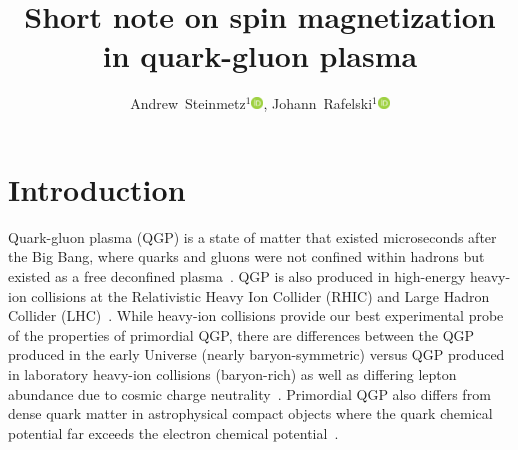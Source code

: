 \documentclass[epjST]{svjour}
\newcommand{\orcidicon}{\includegraphics[width=0.32cm]{orcid.pdf}}
\newcommand{\orc}[1]{\href{https://orcid.org/#1}{\orcidicon}}
\newcommand{\orcJR}{0000-0001-8217-1484}
\newcommand{\orcAJS}{0000-0001-5474-2649}
\begin{document}
\title{Short note on spin magnetization in quark-gluon plasma
    }

\author{
    Andrew~Steinmetz${}^1$\orc{\orcAJS},
    Johann~Rafelski${}^1$\orc{\orcJR}
    }



\maketitle

\section{Introduction}
\label{sec:introduction}
Quark-gluon plasma (QGP) is a state of matter that existed microseconds after the Big Bang, where quarks and gluons were not confined within hadrons but existed as a free deconfined plasma~\cite{Letessier:2002ony,Rafelski:2015cxa,Rafelski:2023emw,Rafelski:2024fej,Shuryak:2004cy,HotQCD:2014kol}. QGP is also produced in high-energy heavy-ion collisions at the Relativistic Heavy Ion Collider (RHIC) and Large Hadron Collider (LHC)~\cite{Rafelski:1982pu,STAR:2005gfr,Palni:2024wdy,Grayson:2024okq,Mu:2025gtr}. While heavy-ion collisions provide our best experimental probe of the properties of primordial QGP, there are differences between the QGP produced in the early Universe (nearly baryon-symmetric) versus QGP produced in laboratory heavy-ion collisions (baryon-rich) as well as differing lepton abundance due to cosmic charge neutrality~\cite{Yang:2024ret}. Primordial QGP also differs from dense quark matter in astrophysical compact objects where the quark chemical potential far exceeds the electron chemical potential~\cite{Ghosh:2025sjn}.
\end{document}

